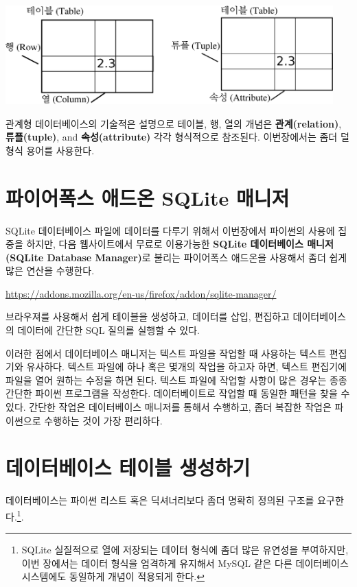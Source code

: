 \beforefig
\centerline{\includegraphics[height=1.50in]{figs2/relational.eps}}
\afterfig

관계형 데이터베이스의 기술적은 설명으로 테이블, 행, 열의 개념은 {\bf 관계(relation)}, {\bf 튜플(tuple)}, and {\bf 속성(attribute)} 각각 형식적으로 참조된다.
이번장에서는 좀더 덜 형식 용어를 사용한다.

\section{파이어폭스 애드온 SQLite 매니저}
SQLite 데이터베이스 파일에 데이터를 다루기 위해서 이번장에서 파이썬의 사용에 집중을 하지만, 다음 웹사이트에서 무료로 이용가능한
{\bf SQLite 데이터베이스 매니저(SQLite Database Manager)}로 불리는 파이어폭스 애드온을 사용해서 좀더 쉽게 많은 연산을 수행한다.

\url{https://addons.mozilla.org/en-us/firefox/addon/sqlite-manager/}

브라우져를 사용해서 쉽게 테이블을 생성하고, 데이터를 삽입, 편집하고 데이터베이스의 데이터에 간단한 SQL 질의를 실행할 수 있다.

이러한 점에서 데이터베이스 매니저는 텍스트 파일을 작업할 때 사용하는 텍스트 편집기와 유사하다.
텍스트 파일에 하나 혹은 몇개의 작업을 하고자 하면, 텍스트 편집기에 파일을 열어 원하는 수정을 하면 된다.
텍스트 파일에 작업할 사항이 많은 경우는 종종 간단한 파이썬 프로그램을 작성한다. 
데이터베이트로 작업할 때 동일한 패턴을 찾을 수 있다. 간단한 작업은 데이터베이스 매니저를 통해서 수행하고,
좀더 복잡한 작업은 파이썬으로 수행하는 것이 가장 편리하다.


\section{데이터베이스 테이블 생성하기}

데이터베이스는 파이썬 리스트 혹은 딕셔너리보다 좀더 명확히 정의된 구조를 요구한다.\footnote{
SQLite 실질적으로 열에 저장되는 데이터 형식에 좀더 많은 유연성을 부여하지만,
이번 장에서는 데이터 형식을 엄격하게 유지해서 MySQL 같은 다른 데이터베이스 시스템에도 동일하게 개념이 적용되게 한다.}.  

